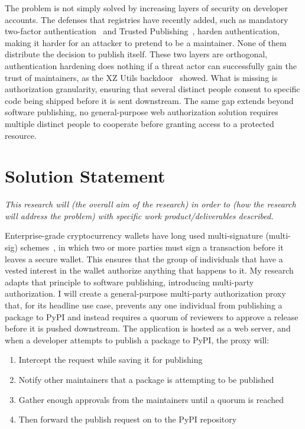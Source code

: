\documentclass[12pt]{article}
\newcommand{\instruction}[1]{{\small\itshape #1}}
\begin{document}
The problem is not simply solved by increasing layers of security on developer accounts. The defenses that registries have recently added, such as mandatory two-factor authentication~\cite{npm-2fa-top100} and Trusted Publishing~\cite{pypi-trusted-publishing}, harden authentication, making it harder for an attacker to pretend to be a maintainer. None of them distribute the decision to publish itself. These two layers are orthogonal, authentication hardening does nothing if a threat actor can successfully gain the trust of maintainers, as the XZ Utils backdoor~\cite{cve-2024-3094} showed. What is missing is authorization granularity, ensuring that several distinct people consent to specific code being shipped before it is sent downstream. The same gap extends beyond software publishing, no general-purpose web authorization solution requires multiple distinct people to cooperate before granting access to a protected resource.

\section*{Solution Statement}

\instruction{This research will (the overall aim of the research) in order to (how the research will address the problem) with specific work product/deliverables described.}

Enterprise-grade cryptocurrency wallets have long used multi-signature (multi-sig) schemes~\cite{bip11-multisig}, in which two or more parties must sign a transaction before it leaves a secure wallet. This ensures that the group of individuals that have a vested interest in the wallet authorize anything that happens to it. My research adapts that principle to software publishing, introducing multi-party authorization. I will create a general-purpose multi-party authorization proxy that, for its headline use case, prevents any one individual from publishing a package to PyPI and instead requires a quorum of reviewers to approve a release before it is pushed downstream. The application is hosted as a web server, and when a developer attempts to publish a package to PyPI, the proxy will:

\begin{enumerate}
  \item Intercept the request while saving it for publishing
  \item Notify other maintainers that a package is attempting to be published
  \item Gather enough approvals from the maintainers until a quorum is reached
  \item Then forward the publish request on to the PyPI repository
\end{enumerate}
\end{document}

